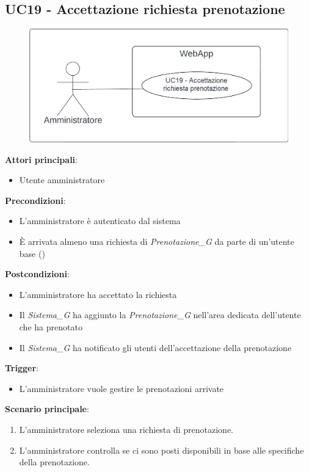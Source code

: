 \subsection{UC19 - Accettazione richiesta prenotazione}\label{usecase:19}
\begin{figure}[H]
    \centering
    \includegraphics[width=0.9\linewidth]{ucd/ucd19.png}
\end{figure}
\textbf{Attori principali}:
\begin{itemize}
    \item Utente amministratore
\end{itemize}
\textbf{Precondizioni}:
\begin{itemize}
    \item L'amministratore è autenticato dal sistema
    \item \`E arrivata almeno una richiesta di \textit{Prenotazione_G} da parte di un'utente base ()
\end{itemize}
\textbf{Postcondizioni}:
\begin{itemize}
    \item L'amministratore ha accettato la richiesta
    \item Il \textit{Sistema_G} ha aggiunto la \textit{Prenotazione_G} nell'area dedicata dell'utente che ha prenotato
    \item Il \textit{Sistema_G} ha notificato gli utenti dell'accettazione della prenotazione
\end{itemize}
\textbf{Trigger}:
\begin{itemize}
    \item L'amministratore vuole gestire le prenotazioni arrivate
\end{itemize}
\textbf{Scenario principale}:
\begin{enumerate}
    \item L'amministratore seleziona una richiesta di prenotazione.
    \item L'amministratore controlla se ci sono posti disponibili in base alle specifiche della prenotazione.
\end{enumerate}

